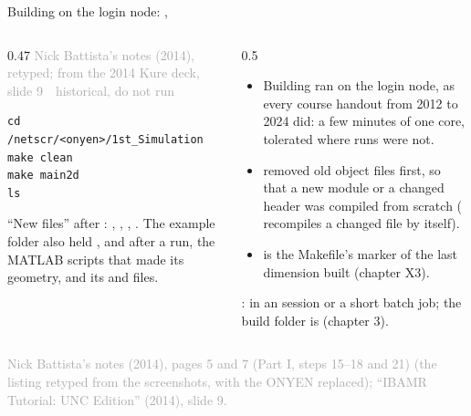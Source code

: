 \documentclass[aspectratio=169,11pt]{beamer}
\newcommand{\sourcecredit}[1]{\vfill\begin{flushright}\tiny\textcolor{DarkGray}{#1}\end{flushright}}
\newcommand{\hist}[1]{{\tiny\sffamily\textcolor{DarkGray}{#1\ \textbullet\ historical, do not run}}\par\nointerlineskip\vspace{0.3mm}}
\begin{document}
\begin{frame}[fragile]{Building on the login node: , }
\label{fr:loginbuild}
\begin{columns}[T,onlytextwidth]
\begin{column}{0.47\textwidth}
\hist{Nick Battista's notes (2014), retyped;  from the 2014 Kure deck, slide 9}
\begin{lstlisting}[style=hist]
cd /netscr/<onyen>/1st_Simulation
make clean
make main2d
ls
\end{lstlisting}
\footnotesize ``New files'' after : , , , . The example folder also held ,  and  after a run, the MATLAB scripts that made its geometry, and its  and  files.
\end{column}
\begin{column}{0.5\textwidth}
\footnotesize
\begin{itemize}\setlength{\itemsep}{2pt}
  \item Building ran on the login node, as every course handout from 2012 to 2024 did: a few minutes of one core, tolerated where runs were not.
  \item {} removed old object files first, so that a new module or a changed header was compiled from scratch ( recompiles a changed  file by itself).
  \item {} is the Makefile's marker of the last dimension built (chapter X3).
\end{itemize}
\vspace{1mm}
:  in an  session or a short batch job; the build folder is  (chapter 3).
\end{column}
\end{columns}
\sourcecredit{Nick Battista's notes (2014), pages 5 and 7 (Part I, steps 15--18 and 21) (the listing retyped from the screenshots, with the ONYEN replaced); ``IBAMR Tutorial: UNC Edition'' (2014), slide 9.}
\end{frame}
\end{document}
